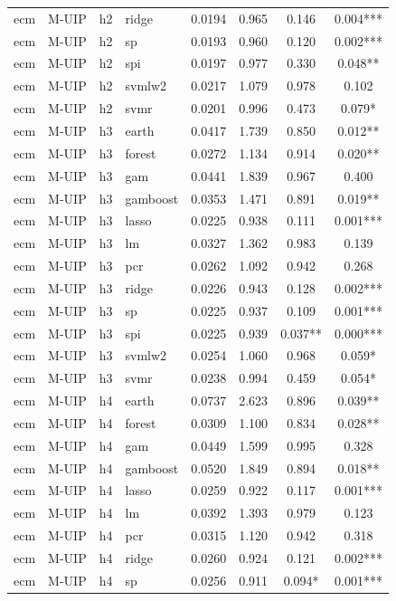 \begin{ThreePartTable}
\begin{longtable}[t]{llclcccc}
ecm & M-UIP & h2 & ridge & 0.0194 & 0.965 & 0.146 & 0.004***\\
ecm & M-UIP & h2 & sp & 0.0193 & 0.960 & 0.120 & 0.002***\\
ecm & M-UIP & h2 & spi & 0.0197 & 0.977 & 0.330 & 0.048**\\
ecm & M-UIP & h2 & svmlw2 & 0.0217 & 1.079 & 0.978 & 0.102\\
ecm & M-UIP & h2 & svmr & 0.0201 & 0.996 & 0.473 & 0.079*\\
\addlinespace
ecm & M-UIP & h3 & earth & 0.0417 & 1.739 & 0.850 & 0.012**\\
ecm & M-UIP & h3 & forest & 0.0272 & 1.134 & 0.914 & 0.020**\\
ecm & M-UIP & h3 & gam & 0.0441 & 1.839 & 0.967 & 0.400\\
ecm & M-UIP & h3 & gamboost & 0.0353 & 1.471 & 0.891 & 0.019**\\
ecm & M-UIP & h3 & lasso & 0.0225 & 0.938 & 0.111 & 0.001***\\
ecm & M-UIP & h3 & lm & 0.0327 & 1.362 & 0.983 & 0.139\\
ecm & M-UIP & h3 & pcr & 0.0262 & 1.092 & 0.942 & 0.268\\
ecm & M-UIP & h3 & ridge & 0.0226 & 0.943 & 0.128 & 0.002***\\
ecm & M-UIP & h3 & sp & 0.0225 & 0.937 & 0.109 & 0.001***\\
ecm & M-UIP & h3 & spi & 0.0225 & 0.939 & 0.037** & 0.000***\\
ecm & M-UIP & h3 & svmlw2 & 0.0254 & 1.060 & 0.968 & 0.059*\\
ecm & M-UIP & h3 & svmr & 0.0238 & 0.994 & 0.459 & 0.054*\\
\addlinespace
ecm & M-UIP & h4 & earth & 0.0737 & 2.623 & 0.896 & 0.039**\\
ecm & M-UIP & h4 & forest & 0.0309 & 1.100 & 0.834 & 0.028**\\
ecm & M-UIP & h4 & gam & 0.0449 & 1.599 & 0.995 & 0.328\\
ecm & M-UIP & h4 & gamboost & 0.0520 & 1.849 & 0.894 & 0.018**\\
ecm & M-UIP & h4 & lasso & 0.0259 & 0.922 & 0.117 & 0.001***\\
ecm & M-UIP & h4 & lm & 0.0392 & 1.393 & 0.979 & 0.123\\
ecm & M-UIP & h4 & pcr & 0.0315 & 1.120 & 0.942 & 0.318\\
ecm & M-UIP & h4 & ridge & 0.0260 & 0.924 & 0.121 & 0.002***\\
ecm & M-UIP & h4 & sp & 0.0256 & 0.911 & 0.094* & 0.001***\\

\end{longtable}
\end{ThreePartTable}
